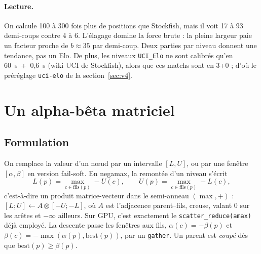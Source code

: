\documentclass[11pt,a4paper]{article}
\newcommand{\code}[1]{\texttt{#1}}
\begin{document}
\paragraph{Lecture.} On calcule 100 à 300 fois plus de positions que Stockfish, mais il voit
17 à 93 demi-coups contre 4 à 6. L'élagage domine la force brute : la pleine largeur paie un
facteur proche de $b\approx35$ par demi-coup. Deux parties par niveau donnent une tendance, pas un
Elo. De plus, les niveaux \code{UCI\_Elo} ne sont calibrés qu'en 60~s~+~0{,}6~s (wiki UCI de
Stockfish), alors que ces matchs sont en 3+0 ; d'où le préréglage \code{uci-elo} de la
section~\ref{sec:v4}.

\section{Un alpha-bêta matriciel}
\subsection{Formulation}
On remplace la valeur d'un nœud par un intervalle $[L,U]$, ou par une fenêtre
$[\alpha,\beta]$ en version fail-soft. En negamax, la remontée d'un niveau s'écrit
\[
L(p)=\max_{c\in\mathrm{fils}(p)} -U(c),\qquad U(p)=\max_{c\in\mathrm{fils}(p)} -L(c),
\]
c'est-à-dire un produit matrice-vecteur dans le semi-anneau $(\max,+)$ :
$[L;U]\leftarrow A\otimes[-U;-L]$, où $A$ est l'adjacence parent--fils, creuse, valant $0$ sur
les arêtes et $-\infty$ ailleurs. Sur GPU, c'est exactement le \code{scatter\_reduce(amax)} déjà
employé. La descente passe les fenêtres aux fils, $\alpha(c)=-\beta(p)$ et
$\beta(c)=-\max(\alpha(p),\mathrm{best}(p))$, par un \code{gather}. Un parent est \emph{coupé}
dès que $\mathrm{best}(p)\ge\beta(p)$.
\end{document}
